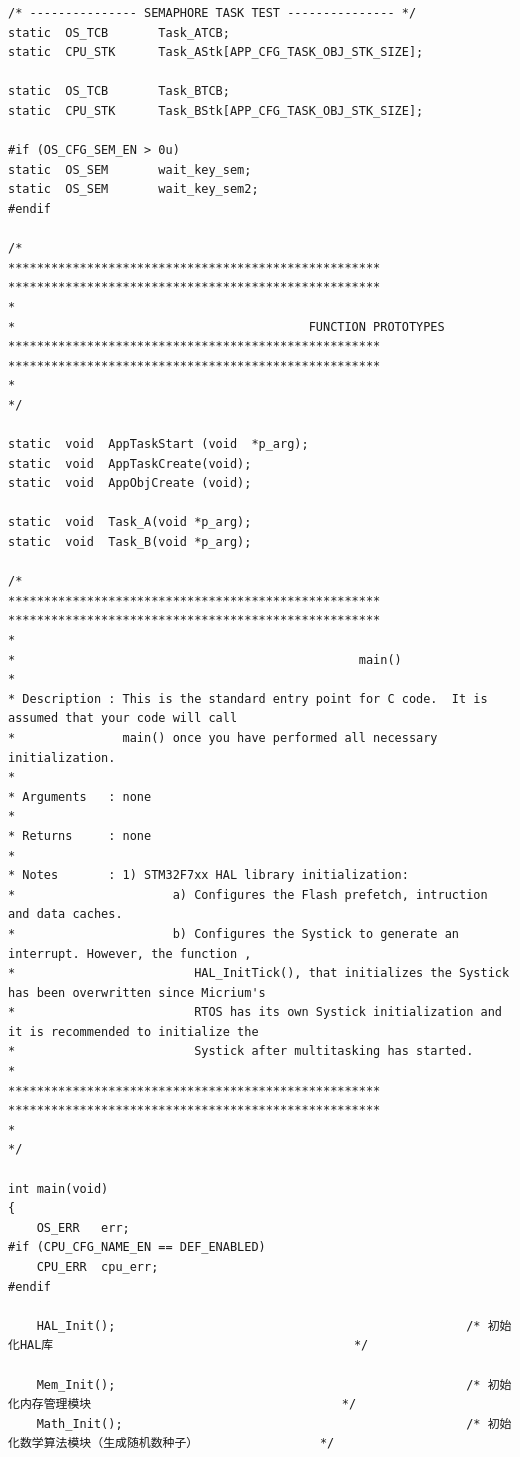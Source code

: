 ﻿\documentclass[UTF8,12pt]{article}
\begin{document}
\begin{lstlisting}[frame=shadowbox]
/* --------------- SEMAPHORE TASK TEST --------------- */
static  OS_TCB       Task_ATCB;
static  CPU_STK      Task_AStk[APP_CFG_TASK_OBJ_STK_SIZE];

static  OS_TCB       Task_BTCB;
static  CPU_STK      Task_BStk[APP_CFG_TASK_OBJ_STK_SIZE];

#if (OS_CFG_SEM_EN > 0u)
static  OS_SEM       wait_key_sem;
static  OS_SEM       wait_key_sem2;
#endif

/*
****************************************************
****************************************************
*
*                                         FUNCTION PROTOTYPES
****************************************************
****************************************************
*
*/

static  void  AppTaskStart (void  *p_arg);
static  void  AppTaskCreate(void);
static  void  AppObjCreate (void);

static  void  Task_A(void *p_arg);
static  void  Task_B(void *p_arg);

/*
****************************************************
****************************************************
*
*                                                main()
*
* Description : This is the standard entry point for C code.  It is assumed that your code will call
*               main() once you have performed all necessary initialization.
*
* Arguments   : none
*
* Returns     : none
*
* Notes       : 1) STM32F7xx HAL library initialization:
*                      a) Configures the Flash prefetch, intruction and data caches.
*                      b) Configures the Systick to generate an interrupt. However, the function ,
*                         HAL_InitTick(), that initializes the Systick has been overwritten since Micrium's
*                         RTOS has its own Systick initialization and it is recommended to initialize the
*                         Systick after multitasking has started.
*
****************************************************
****************************************************
*
*/

int main(void)
{
    OS_ERR   err;
#if (CPU_CFG_NAME_EN == DEF_ENABLED)
    CPU_ERR  cpu_err;
#endif

    HAL_Init();                                                 /* 初始化HAL库                                          */

    Mem_Init();                                                 /* 初始化内存管理模块                                   */
    Math_Init();                                                /* 初始化数学算法模块（生成随机数种子）                 */


\end{lstlisting}
\end{document}
